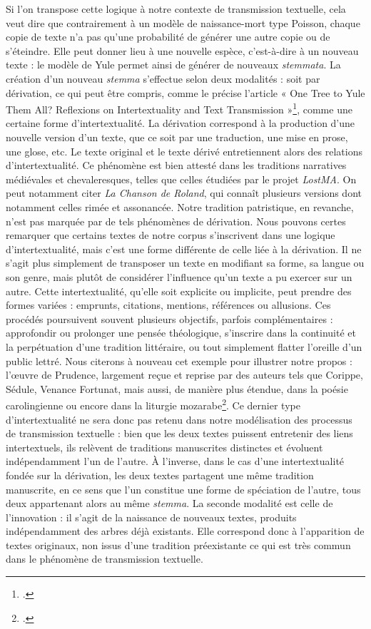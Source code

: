\documentclass[a4paper,twoside,12pt]{book}
\begin{document}
Si l'on transpose cette logique à notre contexte de transmission textuelle, cela veut dire que contrairement à un modèle de naissance-mort type Poisson, chaque copie de texte n'a pas qu'une probabilité de générer une autre copie ou de s'éteindre. Elle peut donner lieu à une nouvelle espèce, c’est-à-dire à un nouveau texte : le modèle de Yule permet ainsi de générer de nouveaux \textit{stemmata}. La création d’un nouveau \textit{stemma} s’effectue selon deux modalités : soit par dérivation, ce qui peut être compris, comme le précise l’article « One Tree to Yule Them All? Reflexions on Intertextuality and Text Transmission »\footcite[p.1--2]{yule12tree}, comme une certaine forme d’intertextualité. La dérivation correspond à la production d’une nouvelle version d’un texte, que ce soit par une traduction, une mise en prose, une glose, etc. Le texte original et le texte dérivé entretiennent alors des relations d’intertextualité. Ce phénomène est bien attesté dans les traditions narratives médiévales et chevaleresques, telles que celles étudiées par le projet \textit{LostMA}. On peut notamment citer \textit{La Chanson de Roland}, qui connaît plusieurs versions dont notamment celles rimée et assonancée. Notre tradition patristique, en revanche, n’est pas marquée par de tels phénomènes de dérivation. Nous pouvons certes remarquer que certains textes de notre corpus s’inscrivent dans une logique d’intertextualité, mais c'est une forme différente de celle liée à la dérivation. Il ne s’agit plus simplement de transposer un texte en modifiant sa forme, sa langue ou son genre, mais plutôt de considérer l’influence qu’un texte a pu exercer sur un autre. Cette intertextualité, qu’elle soit explicite ou implicite, peut prendre des formes variées : emprunts, citations, mentions, références ou allusions. Ces procédés poursuivent souvent plusieurs objectifs, parfois complémentaires : approfondir ou prolonger une pensée théologique, s’inscrire dans la continuité et la perpétuation d'une tradition littéraire, ou tout simplement flatter l’oreille d’un public lettré. Nous citerons à nouveau cet exemple pour illustrer notre propos : l’œuvre de Prudence, largement reçue et reprise par des auteurs tels que Corippe, Sédule, Venance Fortunat, mais aussi, de manière plus étendue, dans la poésie carolingienne ou encore dans la liturgie mozarabe\footcite{receptionpaulinprudence}. Ce dernier type d’intertextualité ne sera donc pas retenu dans notre modélisation des processus de transmission textuelle : bien que les deux textes puissent entretenir des liens intertextuels, ils relèvent de traditions manuscrites distinctes et évoluent indépendamment l’un de l’autre. À l’inverse, dans le cas d’une intertextualité fondée sur la dérivation, les deux textes partagent une même tradition manuscrite, en ce sens que l’un constitue une forme de spéciation de l’autre, tous deux appartenant alors au même \textit{stemma}. La seconde modalité est celle de l’innovation : il s’agit de la naissance de nouveaux textes, produits indépendamment des arbres déjà existants. Elle correspond donc à l’apparition de textes originaux, non issus d’une tradition préexistante ce qui est très commun dans le phénomène de transmission textuelle.
\end{document}
